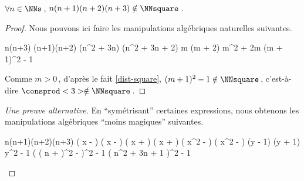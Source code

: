 \begin{fact} \label{case-4}
	 $\forall n \in \NNs$\,, $n(n+1)(n+2)(n+3) \notin \NNsquare$\,.
\end{fact}




\begin{proof}
    Nous pouvons ici faire les manipulations algébriques naturelles suivantes.
    
    \medskip
    
    \begin{stepcalc}[style = sar]
    \explnext{}
    	n(n+3) \cdot (n+1)(n+2)
    \explnext{}
    	(n^2 + 3n) \cdot (n^2 + 3n + 2)
    	m (m + 2)
    \explnext{}
    	m^2 + 2m
    \explnext{}
    	(m + 1)^2 - 1
    \end{stepcalc}
    
    \medskip
    
    Comme $m > 0$\,, d'après le fait \ref{dist-square}, $(m + 1)^2 - 1 \notin \NNsquare$\,, c'est-à-dire $\consprod<3> \notin \NNsquare$\,. 
\end{proof}




\begin{proof}[Une preuve alternative]
	En \enquote{symétrisant} certaines expressions, nous obtenons les manipulations algébriques \enquote{moins magiques} suivantes.
    
    \medskip
    
    \begin{stepcalc}[style = sar]
    \explnext{}
    	n(n+1)(n+2)(n+3)
    	\big( x -  \big) \big( x -  \big) \big( x +  \big) \big( x +  \big)
    \explnext{}
    	\big( x^2 -  \big) \big( x^2 -  \big)
    	(y - 1) (y + 1)
    \explnext{}
    	y^2 - 1
    \explnext{}
    	\Big( \big( n +  \big)^2 -  \Big)^2 - 1
    \explnext{}
    	\big( n^2 + 3n + 1 \big)^2 - 1
    \end{stepcalc}

	\vspace{-2ex}	
	\leavevmode
\end{proof}

